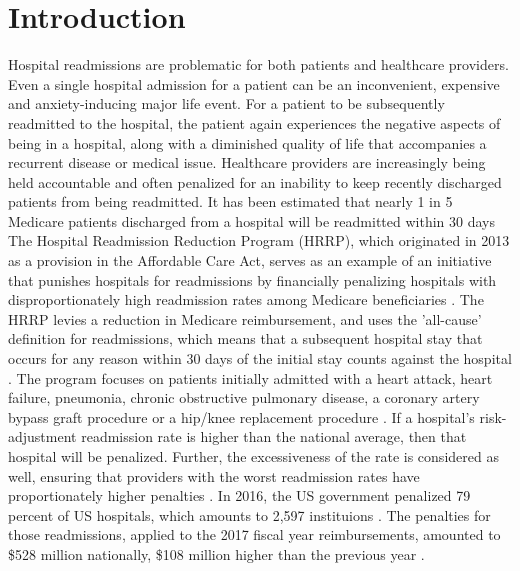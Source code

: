 \documentclass[sigconf]{acmart}
\begin{document}

\maketitle

\section{Introduction}

Hospital readmissions are problematic for both patients and healthcare providers. Even a single hospital admission for a patient can be an inconvenient, expensive and anxiety-inducing major life event. For a patient to be subsequently readmitted to the hospital, the patient again experiences the negative aspects of being in a hospital, along with a diminished quality of life that accompanies a recurrent disease or medical issue. Healthcare providers are increasingly being held accountable and often penalized for an inability to keep recently discharged patients from being readmitted. It has been estimated that nearly 1 in 5 Medicare patients discharged from a hospital will be readmitted within 30 days \cite{cite05}
The Hospital Readmission Reduction Program (HRRP), which originated in 2013 as a provision in the Affordable Care Act, serves as an example of an initiative that punishes hospitals for readmissions by financially penalizing hospitals with disproportionately high readmission rates among Medicare beneficiaries \cite{cite06}. The HRRP levies a reduction in Medicare reimbursement, and uses the 'all-cause' definition for readmissions, which means that a subsequent hospital stay that occurs for any reason within 30 days of the initial stay counts against the hospital \cite{cite06}. The program focuses on patients initially admitted with a heart attack, heart failure, pneumonia, chronic obstructive pulmonary disease, a coronary artery bypass graft procedure or a hip/knee replacement procedure \cite{cite06}. If a hospital's risk-adjustment readmission rate is higher than the national average, then that hospital will be penalized. Further, the excessiveness of the rate is considered as well, ensuring that providers with the worst readmission rates have proportionately higher penalties \cite{cite06}. In 2016, the US government penalized 79 percent of US hospitals, which amounts to 2,597 instituions \cite{cite00}. The penalties for those readmissions, applied to the 2017 fiscal year reimbursements, amounted to \$528 million nationally, \$108 million higher than the previous year \cite{cite00}. 
\end{document}
